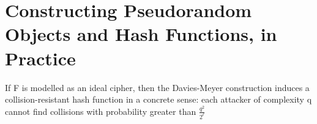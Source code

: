 \documentclass[../main]{subfiles}
\begin{document}
\chapter{Constructing Pseudorandom Objects and Hash
Functions, in Practice}

\begin{theorem}
If F is modelled as an ideal cipher, then the Davies-Meyer construction induces a collision-resistant hash function in a concrete sense: each attacker of complexity q cannot find collisions with probability greater than $\frac{q^2}{2^{\mathbb{\ell}}}$
\end{theorem}
\end{document}
